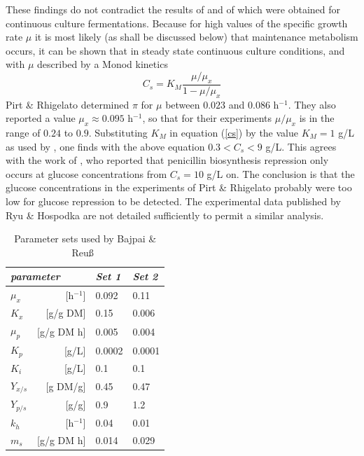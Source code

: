 \documentclass[ba]{imsart}
\numberwithin{equation}{section}
\theoremstyle{plain}
\begin{document}
These findings do not contradict the results of \cite{akaike} and of
\cite{hilbe} which were obtained for continuous culture fermentations.
Because for high values of the specific growth rate $\mu$ it is most
likely (as shall be discussed below) that maintenance metabolism
occurs, it can be shown that in steady state continuous culture
conditions, and with $\mu$ described by a Monod kinetics
\begin{equation}
    C_{s}  =  K_{M} \frac{\mu/\mu_{x}}{1-\mu/\mu_{x}} \label{cs}
\end{equation}
Pirt \& Rhigelato determined $\pi$ for $\mu$ between
$0.023$ and $0.086$ h$^{-1}$.
They also reported a value $\mu_{x} \approx 0.095$
h$^{-1}$, so that for their experiments $\mu/\mu_{x}$ is in the range
of $0.24$ to $0.9$.
Substituting $K _M$ in equation (\ref{cs}) by
the value $K_{M}=1$ g/L as used by \cite{akaike}, one finds
with the above equation $0.3 < C_{s} < 9$ g/L. This agrees with
the work of  \cite{hilbe}, who reported that penicillin biosynthesis
repression only occurs at glucose concentrations from $C_{s}=10$ g/L on.
The conclusion is that the glucose concentrations in the experiments of
Pirt \& Rhigelato probably were too low for glucose repression to be
detected. The experimental data published by Ryu \& Hospodka
are not detailed sufficiently to permit a similar analysis.


\begin{table}
\begin{tabular}{lrll}
\hline
\multicolumn{2}{l}{\it parameter} & {\it Set 1} & {\it Set 2}\\
\hline
$\mu_{x}$           & [h$^{-1}$]  & 0.092       & 0.11          \\
$K_{x}$             & [g/g DM]     & 0.15        & 0.006         \\
$\mu_{p}$           & [g/g DM h]  & 0.005       & 0.004         \\
$K_{p}$             & [g/L]        & 0.0002      & 0.0001        \\
$K_{i}$             & [g/L]        & 0.1         & 0.1           \\
$Y_{x/s}$           & [g DM/g]     & 0.45        & 0.47          \\
$Y_{p/s}$           & [g/g]        & 0.9         & 1.2           \\
$k_{h}$             & [h$^{-1}$]  & 0.04        & 0.01          \\
$m_{s}$             & [g/g DM h]  & 0.014       & 0.029         \\
\hline
\end{tabular}
\caption{Parameter sets used by Bajpai \& Reu\ss\ }\label{parset}
\end{table}
\end{document}
